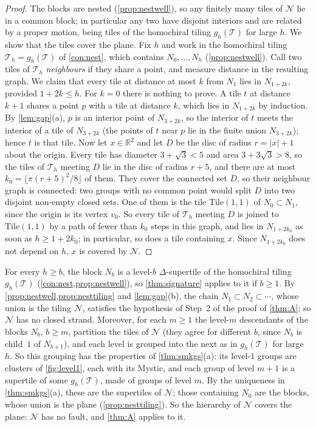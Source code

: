 \documentclass[11pt]{amsart}
\theoremstyle{definition}
\theoremstyle{remark}
\newcommand{\Tile}{\mathrm{Tile}(1,1)}
\newcommand{\T}{\mathcal T}
\newcommand{\N}{\mathcal N}
\newcommand{\RR}{\mathbb R}
\begin{document}
\begin{proof}
The blocks are nested (\cref{prop:nestwell}), so any finitely many tiles of $\N$ lie in a common block; in particular
any two have disjoint interiors and are related by a proper motion, being tiles of the homochiral tiling $g_h(\T)$ for
large $h$. We show that the tiles cover the plane. Fix $h$ and work in the homochiral tiling
$\T_h=g_h(\T)$ of \cref{con:nest}, which contains $N_0,\dots,N_h$ (\cref{prop:nestwell}). Call two tiles of $\T_h$
\emph{neighbours} if they share a point, and measure distance in the resulting graph. We claim that every tile at
distance at most $k$ from $N_1$ lies in $N_{1+2k}$, provided $1+2k\le h$. For $k=0$ there is nothing to prove. A tile
$t$ at distance $k+1$ shares a point $p$ with a tile at distance $k$, which lies in $N_{1+2k}$ by induction. By
\cref{lem:gap}(a), $p$ is an interior point of $N_{3+2k}$, so the interior of $t$ meets the interior of a tile of
$N_{3+2k}$ (the points of $t$ near $p$ lie in the finite union $N_{3+2k}$); hence $t$ is that tile. Now let $x\in\RR^2$ and let $D$ be the disc of radius $r=|x|+1$ about the origin.
Every tile has diameter $3+\sqrt3<5$ and area $3+3\sqrt3>8$, so the tiles of $\T_h$ meeting $D$ lie in the disc of
radius $r+5$, and there are at most $k_0=\lfloor\pi(r+5)^2/8\rfloor$ of them. They cover the connected set $D$, so
their neighbour graph is connected: two groups with no common point would split $D$ into two disjoint non-empty closed
sets. One of them is the tile $\Tile$ of $N_0\subset N_1$, since the origin is its vertex
$v_0$. So every tile of $\T_h$ meeting $D$ is joined to $\Tile$ by a path of fewer than $k_0$ steps in this graph, and lies
in $N_{1+2k_0}$ as soon as $h\ge 1+2k_0$; in particular, so does a tile containing $x$. Since $N_{1+2k_0}$ does not depend on $h$, $x$ is covered by $\N$.
\end{proof}

For every $h\ge b$, the block $N_b$ is a level-$b$ $\Delta$-supertile of the homochiral tiling $g_h(\T)$
(\cref{con:nest,prop:nestwell}), so \cref{thm:signature} applies to it if $b\ge1$. By \cref{prop:nestwell,prop:nesttiling} and
\cref{lem:gap}(b),
the chain $N_1\subset N_2\subset\cdots$, whose union is the tiling $\N$, satisfies the hypothesis of Step~2 of the proof of
\cref{thm:A}; so $\N$ has no closed strand. Moreover, for each $m\ge1$ the level-$m$ descendants of the blocks $N_b$,
$b\ge m$, partition the tiles of $\N$ (they agree for different $b$, since $N_b$ is child~$1$ of $N_{b+1}$), and each
level is grouped into the next as in $g_h(\T)$ for large $h$. So this grouping has the properties of
\cref{thm:smkgs}(a): its level-$1$ groups are clusters of \cref{fig:level1}, each with its Mystic, and each group of
level $m+1$ is a supertile of some $g_h(\T)$, made of groups of level $m$. By the uniqueness in \cref{thm:smkgs}(a), these are the
supertiles of $\N$; those containing $N_0$ are the blocks, whose union is the plane (\cref{prop:nesttiling}). So the
hierarchy of $\N$ covers the plane: $\N$ has no fault, and \cref{thm:A} applies to it.
\end{document}
